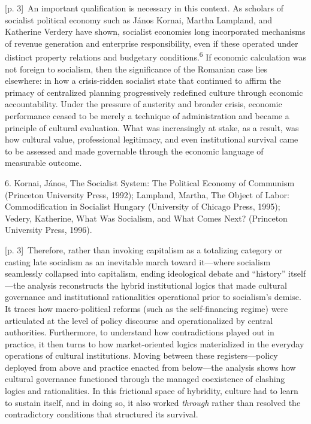 \documentclass[10pt,a4paper]{article}
\begin{document}
{\scriptsize\color{gray} [p. 3]}\ An important qualification is necessary in this context. As scholars of socialist political economy such as János Kornai, Martha Lampland, and Katherine Verdery have shown, socialist economies long incorporated mechanisms of revenue generation and enterprise responsibility, even if these operated under distinct property relations and budgetary conditions.\nobreak\textsuperscript{6} If economic calculation was not foreign to socialism, then the significance of the Romanian case lies elsewhere: in how a crisis-ridden socialist state that continued to affirm the primacy of centralized planning progressively redefined culture through economic accountability. Under the pressure of austerity and broader crisis, economic performance ceased to be merely a technique of administration and became a principle of cultural evaluation. What was increasingly at stake, as a result, was how cultural value, professional legitimacy, and even institutional survival came to be assessed and made governable through the economic language of measurable outcome.\par{\small 6. Kornai, János, The Socialist System: The Political Economy of Communism (Princeton University Press, 1992); Lampland, Martha, The Object of Labor: Commodification in Socialist Hungary (University of Chicago Press, 1995); Vedery, Katherine, What Was Socialism, and What Comes Next? (Princeton University Press, 1996).\par}
{\scriptsize\color{gray} [p. 3]}\ Therefore, rather than invoking capitalism as a totalizing category or casting late socialism as an inevitable march toward it—where socialism seamlessly collapsed into capitalism, ending ideological debate and “history” itself—the analysis reconstructs the hybrid institutional logics that made cultural governance and institutional rationalities operational prior to socialism’s demise. It traces how macro-political reforms (such as the self-financing regime) were articulated at the level of policy discourse and operationalized by central authorities. Furthermore, to understand how contradictions played out in practice, it then turns to how market-oriented logics materialized in the everyday operations of cultural institutions. Moving between these registers—policy deployed from above and practice enacted from below—the analysis shows how cultural governance functioned through the managed coexistence of clashing logics and rationalities. In this frictional space of hybridity, culture had to learn to sustain itself, and in doing so, it also worked \textit{through} rather than resolved the contradictory conditions that structured its survival.\par
\end{document}
